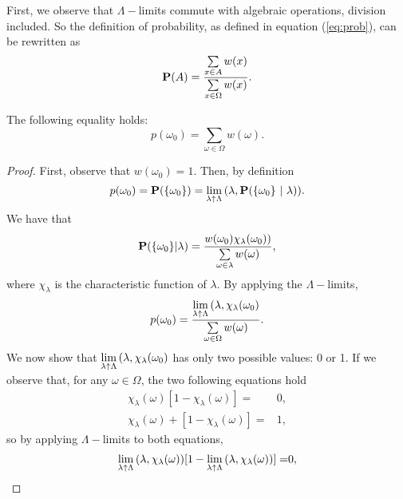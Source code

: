 \documentclass[draft.tex]{subfiles}
\begin{document}
    First, we observe that $\Lambda-$limits commute with algebraic operations, division included. So the definition of probability, as defined in equation (\ref{eq:prob}), can be rewritten as
    \begin{equation}
    \label{eq:prob2}
        \textbf{P}(A) = \frac{\sum\limits_{x \in A} w(x)}{\sum\limits_{x \in \Omega} w(x)}.
    \end{equation}
    \begin{lemma}
    The following equality holds:
    \begin{equation*}
        p(\omega_{0}) = \sum\limits_{\omega \in \Omega} w(\omega).
    \end{equation*}
    \end{lemma}
    \begin{proof}
        First, observe that $w(\omega_{0}) = 1$. Then, by definition
        \begin{equation*}
            p(\omega_{0}) = \prob(\{\omega_{0}\}) = \lambdalim{(\lambda, \prob(\{\omega_{0}\} \ \vert \ \lambda))}.
        \end{equation*}
        We have that
        \begin{equation*}
            \textbf{P}(\{\omega_{0}\} \vert \lambda) = \frac{w(\omega_{0}) \chi_{\lambda}(\omega_{0}))}{\sum\limits_{\omega \in \lambda}w(\omega)},
        \end{equation*}
        where $\chi_{\lambda}$ is the characteristic function of $\lambda$. By applying the $\Lambda-$limits,
        \begin{equation}
        \label{eq:3}
            p(\omega_{0}) = \frac{\lim\limits_{\lambda \uparrow \Lambda}{(\lambda, \chi_{\lambda}(\omega_{0})}}{\sum\limits_{\omega \in \Omega}w(\omega)}.
        \end{equation}
        We now show that $\lim\limits_{\lambda \uparrow \Lambda}{(\lambda, \chi_{\lambda}(\omega_{0})}$ has only two possible values: 0 or 1. If we observe that, for any $\omega \in \Omega$, the two following equations hold
        \begin{align*}
            \chi_{\lambda}(\omega)[1-\chi_{\lambda}(\omega)] =& 0, \\
            \chi_{\lambda}(\omega) + [1-\chi_{\lambda}(\omega)] = & 1,
        \end{align*}
        so by applying $\Lambda-$limits to both equations,
        \begin{align*}
            \lambdalim{(\lambda, \chi_{\lambda}(\omega))}[1-
            \lambdalim{(\lambda, \chi_{\lambda}(\omega))}] =& 0, \\

\end{align*}
\end{proof}
\end{document}
